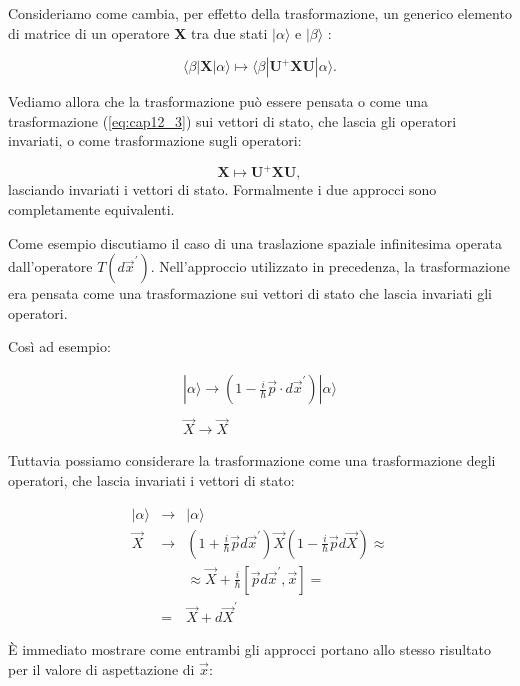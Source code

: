 \documentclass[a4paper,12pt,oneside]{book}
\begin{document}
Consideriamo come cambia, per effetto della trasformazione, un generico elemento di matrice di un operatore \textbf{X} tra due stati $|\alpha \rangle$ e $|\beta\rangle$ :

\begin{equation}
\langle \beta|\textbf{X}|\alpha \rangle   \mapsto    \langle \beta |\textbf{U}^+\textbf{X}\textbf{U}|\alpha \rangle.
\end{equation}

Vediamo allora che la trasformazione può essere pensata o come una trasformazione (\ref{eq:cap12_3})  sui vettori di stato, che lascia gli operatori invariati, o come trasformazione sugli operatori:

\begin{equation}
\label{eq:cap12_4}
\textbf{X}\mapsto \textbf{U}^+ \textbf{X}\textbf{U},
\end{equation}
lasciando invariati i vettori di stato. Formalmente i due approcci sono completamente equivalenti.

Come esempio discutiamo il caso di una traslazione spaziale infinitesima operata dall'operatore $T(d\vec{x}^{'})$.
Nell'approccio utilizzato in precedenza, la trasformazione era pensata come una trasformazione sui vettori di stato che lascia invariati gli operatori.

Così ad esempio:

\begin{eqnarray}
  &|\alpha \rangle \rightarrow (1- \frac{i}{\hbar}\vec{p}\cdot d\vec{x}^{'}) |\alpha \rangle &  \\
	\nonumber \\
 & \vec{X}\rightarrow \vec{X}  & 
\end{eqnarray}

Tuttavia possiamo considerare la trasformazione come una trasformazione degli operatori, che lascia invariati i vettori di stato:

\begin{eqnarray}
	|\alpha \rangle &\rightarrow & |\alpha \rangle \\
	\vec{X} &\rightarrow& (1+ \frac{i}{\hbar} \vec{p} d\vec{x}^{'}) \vec{X} (1-\frac{i}{\hbar} \vec{p} d\vec{X}) \approx \nonumber\\
	& &\approx \vec{X}+ \frac{i}{\hbar}[\vec{p} d\vec{x}^{'},\vec{x}]= \nonumber  \\
	&=&\vec{X}+ d\vec{X}^{'}
\end{eqnarray}

È immediato mostrare come entrambi gli approcci portano allo stesso risultato per il valore di aspettazione di $\vec{x}$:
\end{document}
